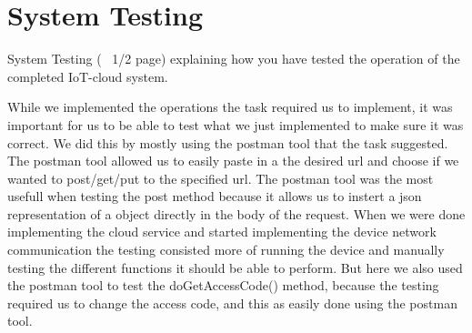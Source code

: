 \section{System Testing}
\label{sec:experiments}

System Testing (~ 1/2 page) explaining how you have tested the operation of the completed IoT-cloud system.

While we implemented the operations the task required us to implement, it was important for us to be able to test what we just implemented to make sure it was correct. We did this by mostly using the postman tool that the task suggested. The postman tool allowed us to easily paste in a the desired url and choose if we wanted to post/get/put to the specified url. The postman tool was the most usefull when testing the post method because it allows us to instert a json representation of a object directly in the body of the request.
When we were done implementing the cloud service and started implementing the device network communication the testing consisted more of running the device and manually testing the different functions it should be able to perform. But here we also used the postman tool to test the doGetAccessCode() method, because the testing required us to change the access code, and this as easily done using the postman tool.